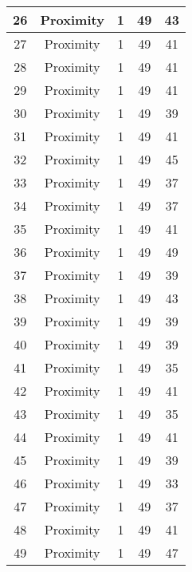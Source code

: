 \documentclass[results.tex]{subfiles}
\begin{document}
\begin{center}
\begin{tabular}{| c || c | c | c | c |}
    \hline
    26 & Proximity & 1 & 49 & 43 \\ 
    \hline
    27 & Proximity & 1 & 49 & 41 \\ 
    \hline
    28 & Proximity & 1 & 49 & 41 \\ 
    \hline
    29 & Proximity & 1 & 49 & 41 \\ 
    \hline
    30 & Proximity & 1 & 49 & 39 \\ 
    \hline
    31 & Proximity & 1 & 49 & 41 \\ 
    \hline
    32 & Proximity & 1 & 49 & 45 \\ 
    \hline
    33 & Proximity & 1 & 49 & 37 \\ 
    \hline
    34 & Proximity & 1 & 49 & 37 \\ 
    \hline
    35 & Proximity & 1 & 49 & 41 \\ 
    \hline
    36 & Proximity & 1 & 49 & 49 \\ 
    \hline
    37 & Proximity & 1 & 49 & 39 \\ 
    \hline
    38 & Proximity & 1 & 49 & 43 \\ 
    \hline
    39 & Proximity & 1 & 49 & 39 \\ 
    \hline
    40 & Proximity & 1 & 49 & 39 \\ 
    \hline
    41 & Proximity & 1 & 49 & 35 \\ 
    \hline
    42 & Proximity & 1 & 49 & 41 \\ 
    \hline
    43 & Proximity & 1 & 49 & 35 \\ 
    \hline
    44 & Proximity & 1 & 49 & 41 \\ 
    \hline
    45 & Proximity & 1 & 49 & 39 \\ 
    \hline
    46 & Proximity & 1 & 49 & 33 \\ 
    \hline
    47 & Proximity & 1 & 49 & 37 \\ 
    \hline
    48 & Proximity & 1 & 49 & 41 \\ 
    \hline
    49 & Proximity & 1 & 49 & 47 \\ 
    \hline   \end{tabular}
\end{center}
\end{document}
